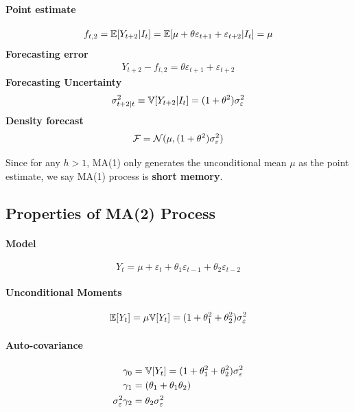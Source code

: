 \documentclass[11pt]{article}
\begin{document}
				\paragraph{Point estimate}
					\begin{gather}
						f_{t,2} = \mathbb{E}[{Y_{t+2} | I_t}]
						= \mathbb{E}[{\mu + \theta \varepsilon_{t+1} + \varepsilon_{t+2} | I_t}]
						= \mu
					\end{gather}
				\textbf{Forecasting error}
					\begin{gather}
						Y_{t+2} - f_{t,2} = \theta \varepsilon_{t+1} + \varepsilon_{t+2}
					\end{gather}
				\textbf{Forecasting Uncertainty}
					\begin{gather}
						\sigma_{t+2|t}^2 \equiv \mathbb{V}[{Y_{t+2} | I_t}]
						= (1 + \theta^2) \sigma_{\varepsilon}^2 
					\end{gather}
				\textbf{Density forecast}
					\begin{gather}
						\mathcal{{F}} = \mathcal{{N}}(\mu, (1 + \theta^2)\sigma_{\varepsilon}^2)
					\end{gather}
				\begin{remark}
					Since for any $h > 1$, MA(1) only generates the unconditional mean $\mu$ as the point estimate, we say MA(1) process is \textbf{short memory}.
				\end{remark}
		\subsection{Properties of MA(2) Process}
			\paragraph{Model}
				\begin{equation}
					Y_t = \mu + \varepsilon_t + \theta_1 \varepsilon_{t-1} + \theta_2 \varepsilon_{t-2}
				\end{equation}
			\paragraph{Unconditional Moments}
				\begin{gather}
					\mathbb{E}[{Y_t}] = \mu
					\mathbb{V}[{Y_t}] = (1 + \theta_1^2 + \theta_2^2) \sigma_\varepsilon^2
				\end{gather}
			\paragraph{Auto-covariance}
				\begin{align}
					\gamma_0 &= \mathbb{V}[{Y_t}] = (1 + \theta_1^2 + \theta_2^2) \sigma_\varepsilon^2 \\ 
					\gamma_1 &= (\theta_1 + \theta_1 \theta_2) \\\sigma_\varepsilon^2
					\gamma_2 &= \theta_2 \sigma_\varepsilon^2
				\end{align}
\end{document}
